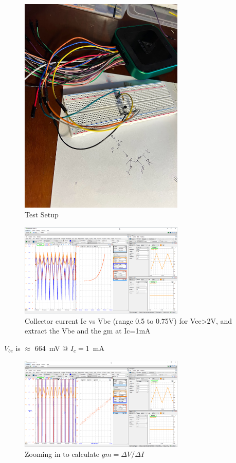 \documentclass{article}
\begin{document}
	\begin{figure}[H]
	    \centering
	    \includegraphics[width=0.7\textwidth]{3b-photo}
	    \caption{Test Setup}
	\end{figure}
	
	\begin{figure}[H]
	    \centering
	    \includegraphics[width=0.7\textwidth]{3b}
	    \caption{Collector current Ic vs Vbe (range 0.5 to 0.75V) for Vce>2V, and extract the Vbe and the gm at Ic=1mA}
	\end{figure}
	
	$V_{be}$ is $\approx$ \SI{664}{\milli\volt} @ $I_c = $\SI{1}{\mA}


	\begin{figure}[H]
	    \centering
	    \includegraphics[width=0.7\textwidth]{3b-2}
	    \caption{Zooming in to calculate $gm = \Delta V / \Delta I$}
	\end{figure}
	
\end{document}
